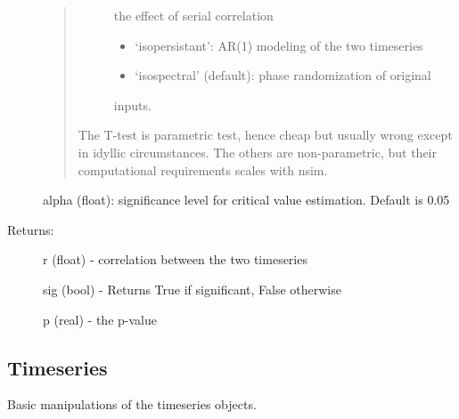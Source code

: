 \documentclass[letterpaper,10pt,english]{sphinxmanual}
\begin{document}
\begin{fulllineitems}
\begin{description}
\begin{quote}
\begin{description}
\begin{itemize}
\end{itemize}

the effect of serial correlation
\begin{itemize}
\item {} 
‘isopersistant’: AR(1) modeling of the two timeseries

\item {} 
‘isospectral’ (default): phase randomization of original

\end{itemize}

inputs.

\end{description}

The T-test is parametric test, hence cheap but usually wrong
except in idyllic circumstances.
The others are non-parametric, but their computational
requirements scales with nsim.
\end{quote}

alpha (float): significance level for critical value estimation. Default is 0.05

\item[{Returns:}] \leavevmode
r (float) - correlation between the two timeseries

sig (bool) -  Returns True if significant, False otherwise

p (real) - the p-value

\end{description}

\end{fulllineitems}



\subsection{Timeseries}
\label{\detokenize{Main:timeseries}}
Basic manipulations of the timeseries objects.
\end{document}
